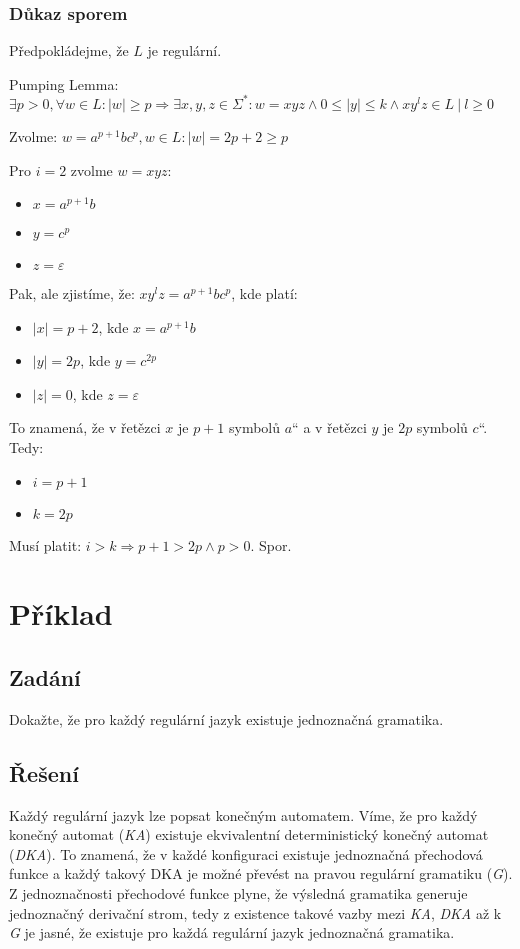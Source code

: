 \documentclass[11pt, a4paper]{article}
\newcommand{\myuv}[1]{\quotedblbase#1\textquotedblleft}
\begin{document}
\subsubsection*{Důkaz sporem}
Předpokládejme, že $L$ je regulární.
\bigskip

\noindent Pumping Lemma: $\exists p > 0, \forall w \in L: |w| \geq p \Rightarrow \exists x,y,z \in \Sigma^*: w = xyz \wedge 0 \leq |y| \leq k \wedge xy^lz \in L\ |\ l \geq 0$
\bigskip

\noindent Zvolme: $ w = a^{p+1}bc^p, w \in L: |w| = 2p+2 \geq p $
\bigskip

\noindent Pro $i = 2$ zvolme $w = xyz$:
\begin{itemize}[label={},noitemsep]
	\item $x = a^{p+1}b$
	\item $y = c^p$
	\item $z = \varepsilon$
\end{itemize}

\noindent Pak, ale zjistíme, že: $xy^lz = a^{p+1}bc^p$, kde platí:
\begin{itemize}[label={},noitemsep]
	\item $|x| = p + 2$, kde $x = a^{p+1}b$
	\item $|y| = 2p$, kde $y = c^{2p}$
	\item $|z| = 0$, kde $z = \varepsilon$
\end{itemize}

\noindent To znamená, že v řetězci $x$ je $p + 1$ symbolů \myuv{$a$} a v řetězci $y$ je $2p$ symbolů \myuv{$c$}. Tedy:
\begin{itemize}[label={},noitemsep]
	\item $i = p + 1$
	\item $k = 2p$
\end{itemize}
\noindent Musí platit: $ i > k \Rightarrow p + 1 > 2p \wedge p > 0$. Spor.

\section{Příklad}
\subsection*{Zadání}
Dokažte, že pro každý regulární jazyk existuje jednoznačná gramatika.
\subsection*{Řešení}
Každý regulární jazyk lze popsat konečným automatem. Víme, že pro každý konečný automat (\textit{KA}) existuje
ekvivalentní deterministický konečný automat (\textit{DKA}). To znamená, že v každé konfiguraci existuje jednoznačná
přechodová funkce a každý takový DKA je možné převést na pravou regulární gramatiku (\textit{G}). Z jednoznačnosti
přechodové funkce plyne, že výsledná gramatika generuje jednoznačný derivační strom, tedy z existence takové vazby mezi
\textit{KA}, \textit{DKA} až k \textit{G} je jasné, že existuje pro každá regulární jazyk jednoznačná gramatika.
\end{document}
